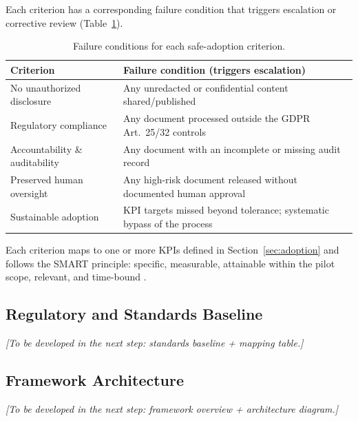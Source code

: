 \documentclass[12pt,a4paper]{article}
\begin{document}
Each criterion has a corresponding failure condition that triggers escalation or corrective review (Table~\ref{tab:failure}).

\begin{table}[h!]
\centering
\small
{}
\begin{tabular}{@{} p{4.5cm} p{9cm} @{}}
\toprule
\textbf{\color{accentdark}Criterion} & \textbf{\color{accentdark}Failure condition (triggers escalation)} \\
\midrule
No unauthorized disclosure & Any unredacted or confidential content shared/published \\
Regulatory compliance & Any document processed outside the GDPR Art.~25/32 controls \\
Accountability \& auditability & Any document with an incomplete or missing audit record \\
Preserved human oversight & Any high-risk document released without documented human approval \\
Sustainable adoption & KPI targets missed beyond tolerance; systematic bypass of the process \\
\bottomrule
\end{tabular}
\caption{Failure conditions for each safe-adoption criterion.}
\label{tab:failure}
\end{table}

Each criterion maps to one or more KPIs defined in Section~\ref{sec:adoption} and follows the SMART principle: specific, measurable, attainable within the pilot scope, relevant, and time-bound \cite{falchi_slides}.

\subsection{Regulatory and Standards Baseline}
\textit{[To be developed in the next step: standards baseline + mapping table.]}

\subsection{Framework Architecture}
\textit{[To be developed in the next step: framework overview + architecture diagram.]}
\end{document}
